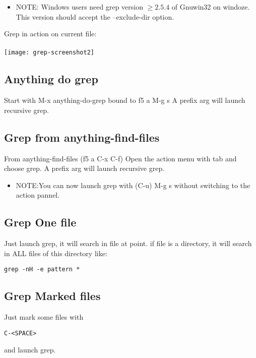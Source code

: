 \documentclass[a4paper,11pt]{article}
\begin{document}
\begin{itemize}
\item NOTE: Windows users need grep version 
\begin{math}
\geq2.5.4
\end{math}
of Gnuwin32 on windoze.
This version should accept the --exclude-dir option.
\end{itemize}

\newpage
Grep in action on current file: \\
\\
\texttt{[image: grep-screenshot2]}

\subsection{Anything do grep}
\label{sec:anything-do-grep}
Start with M-x anything-do-grep bound to f5 a M-g s
A prefix arg will launch recursive grep.

\subsection{Grep from anything-find-files}
\label{sec:grep-from-anything}
From anything-find-files (f5 a C-x C-f) Open the action menu with tab and choose grep.
A prefix arg will launch recursive grep.\\

\begin{itemize}
\item NOTE:You can now launch grep with (C-u) M-g s without switching to the action pannel.
\end{itemize}

\subsection{Grep One file}
\label{sec:grep-one-file}
Just launch grep, it will search in file at point.
if file is a directory, it will search in ALL files of this directory like:

\begin{verbatim}
grep -nH -e pattern *
\end{verbatim}


\subsection{Grep Marked files}
\label{sec:grep-marked-files}
Just mark some files with
\begin{verbatim}
C-<SPACE>
\end{verbatim}
and launch grep.
\end{document}
